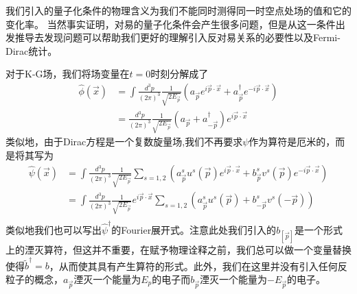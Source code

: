 我们引入的量子化条件的物理含义为我们不能同时测得同一时空点处场的值和它的变化率。
当然事实证明，对易的量子化条件会产生很多问题，但是从这一条件出发推导去发现问题可以帮助我们更好的理解引入反对易关系的必要性以及Fermi-Dirac统计。

对于K-G场，我们将场变量在$t=0$时刻分解成了
\begin{equation}
\begin{aligned}
     \hat{\phi}(\vec{x})&=\int \frac{d^{3}p}{(2\pi)^{3}}\frac{1}{\sqrt{2E_{\vec{p}}}}\left(a_{\vec{p}}e^{i\vec{p}\cdot\vec{x}}+a^{\dagger}_{\vec{p}}e^{-i\vec{p}\cdot\vec{x}}\right)\\
     &=\frac{d^{3}p}{(2\pi)^{3}}\frac{1}{\sqrt{2E_{\vec{p}}}}\left(a_{\vec{p}}+a^{\dagger}_{-\vec{p}}\right)e^{i\vec{p}\cdot\vec{x}}
     \end{aligned}
\end{equation}
类似地，由于Dirac方程是一个复数旋量场,我们不再要求$\psi$作为算符是厄米的，而是将其写为
\begin{equation}
\begin{aligned}
     \hat{\psi}(\vec{x})&=\int \frac{d^{3}p}{(2\pi)^{3}}\frac{1}{\sqrt{2E_{\vec{p}}}}\sum\limits_{s=1,2}\left(a^{s}_{\vec{p}}u^{s}(\vec{p})e^{i\vec{p}\cdot\vec{x}}+b^{s}_{\vec{p}}v^{s}(\vec{p})e^{-i\vec{p}\cdot\vec{x}}\right)\\
     &=\int \frac{d^{3}p}{(2\pi)^{3}}\frac{1}{\sqrt{2E_{\vec{p}}}}e^{i\vec{p}\cdot\vec{x}}\sum\limits_{s=1,2}\left(a^{s}_{\vec{p}}u^{s}(\vec{p})+b^{s}_{-\vec{p}}v^{s}(-\vec{p})\right)\\
     \end{aligned}
    \end{equation}
类似地我们也可以写出$\hat{\psi}^{\dagger}$的Fourier展开式。注意此处我们引入的$b_[\vec{p}]$是一个形式上的湮灭算符，但这并不重要，在赋予物理诠释之前，我们总可以做一个变量替换使得$\tilde{b}^{\dagger}=b$，从而使其具有产生算符的形式。此外，我们在这里并没有引入任何反粒子的概念，$a_{\vec{p}}$湮灭一个能量为$E_{p}$的电子而$b_{\vec{p}}$湮灭一个能量为$-E_{\vec{p}}$的电子。

